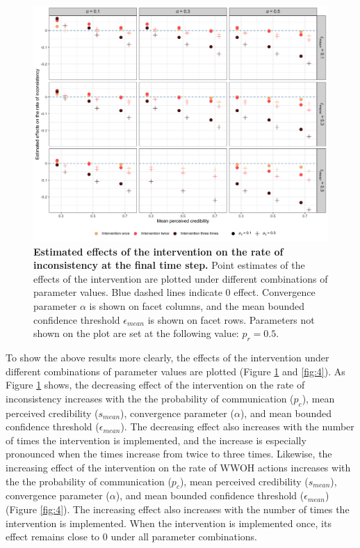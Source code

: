 \documentclass[
  11pt,
]{article}
\begin{document}
\begin{figure}[h]
  \centering
  \includegraphics[width=1\columnwidth]{./figures/intervention_effect_p_inconsistency.png}
  \caption{\textbf{Estimated effects of the intervention on the rate of inconsistency at the final time step.} Point estimates of the effects of the intervention are plotted under different combinations of parameter values. Blue dashed lines indicate 0 effect. Convergence parameter $\alpha$ is shown on facet columns, and the mean bounded confidence threshold $\epsilon_{mean}$ is shown on facet rows. Parameters not shown on the plot are set at the following value: $p_r = 0.5$.}
  \label{fig:3}
\end{figure}

To show the above results more clearly, the effects of the intervention
under different combinations of parameter values are plotted (Figure
\ref{fig:3} and \ref{fig:4}). As Figure \ref{fig:3} shows, the
decreasing effect of the intervention on the rate of inconsistency
increases with the the probability of communication (\(p_c\)), mean
perceived credibility (\(s_{mean}\)), convergence parameter
(\(\alpha\)), and mean bounded confidence threshold
(\(\epsilon_{mean}\)). The decreasing effect also increases with the
number of times the intervention is implemented, and the increase is
especially pronounced when the times increase from twice to three times.
Likewise, the increasing effect of the intervention on the rate of WWOH
actions increases with the the probability of communication (\(p_c\)),
mean perceived credibility (\(s_{mean}\)), convergence parameter
(\(\alpha\)), and mean bounded confidence threshold
(\(\epsilon_{mean}\)) (Figure \ref{fig:4}). The increasing effect also
increases with the number of times the intervention is implemented. When
the intervention is implemented once, its effect remains close to 0
under all parameter combinations.
\end{document}
